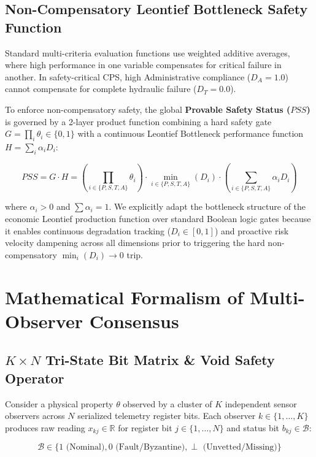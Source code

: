 \documentclass[conference]{IEEEtran}
\begin{document}
\subsection{Non-Compensatory Leontief Bottleneck Safety Function}
Standard multi-criteria evaluation functions use weighted additive averages, where high performance in one variable compensates for critical failure in another. In safety-critical CPS, high Administrative compliance ($D_A = 1.0$) cannot compensate for complete hydraulic failure ($D_T = 0.0$).

To enforce non-compensatory safety, the global \textbf{Provable Safety Status ($PSS$)} is governed by a 2-layer product function combining a hard safety gate $G = \prod_i \theta_i \in \{0, 1\}$ with a continuous Leontief Bottleneck performance function $H = \sum_i \alpha_i D_i$:

\begin{equation}
PSS = G \cdot H = \left( \prod_{i \in \{P, S, T, A\}} \theta_i \right) \cdot \min_{i \in \{P, S, T, A\}} (D_i) \cdot \left( \sum_{i \in \{P, S, T, A\}} \alpha_i D_i \right)
\end{equation}

where $\alpha_i > 0$ and $\sum \alpha_i = 1$. We explicitly adapt the bottleneck structure of the economic Leontief production function over standard Boolean logic gates because it enables continuous degradation tracking ($D_i \in [0, 1]$) and proactive risk velocity dampening across all dimensions prior to triggering the hard non-compensatory $\min_i(D_i) \to 0$ trip.

\section{Mathematical Formalism of Multi-Observer Consensus}

\subsection{$K \times N$ Tri-State Bit Matrix \& Void Safety Operator}
Consider a physical property $\theta$ observed by a cluster of $K$ independent sensor observers across $N$ serialized telemetry register bits. Each observer $k \in \{1, \dots, K\}$ produces raw reading $x_{kj} \in \mathbb{R}$ for register bit $j \in \{1, \dots, N\}$ and status bit $b_{kj} \in \mathcal{B}$:

\begin{equation}
\mathcal{B} \in \{1 \text{ (Nominal)}, 0 \text{ (Fault/Byzantine)}, \perp \text{ (Unvetted/Missing)}\}
\end{equation}
\end{document}
